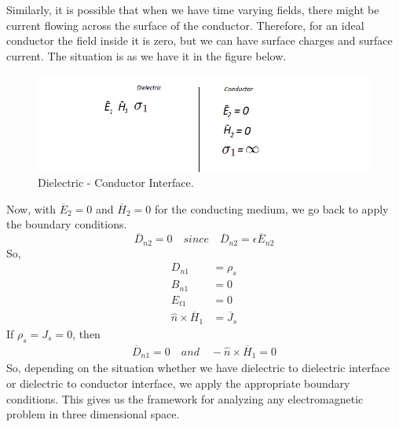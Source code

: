 Similarly, it is possible that when we have time varying fields, there might be current flowing across the surface of the conductor. Therefore, for an ideal conductor the field inside it is zero, but we can have surface charges and surface current. The situation is as we have it in the figure below.
\begin{figure}[h]
\centering
\includegraphics[width=1.2\linewidth]{./graphics/diemedium5_2_2}
\caption{Dielectric - Conductor Interface.}
\end{figure}

Now, with $\overline{E}_2 = 0$ and $\overline{H}_2 = 0$ for the conducting medium, we go back to apply the boundary conditions.
\begin{equation*}
\overline{D}_{n2} = 0\quad since\quad \overline{D}_{n2} = \epsilon\overline{E}_{n2}
\end{equation*}
So,
\begin{align*}
D_{n1} &= \rho_s \\
B_{n1} &= 0 \\
E_{t1} &= 0 \\
\hat{n}\times\overline{H}_1 &= \overline{J}_s
\end{align*}
If $\rho_s = J_s = 0$, then
\begin{align*}
\overline{D}_{n1} = 0\quad and \quad -\hat{n}\times\overline{H}_{1} = 0
\end{align*}
So, depending on the situation whether we have dielectric to dielectric interface or dielectric to conductor interface, we apply the appropriate boundary conditions. This gives us the framework for analyzing any electromagnetic problem in three dimensional space. 

